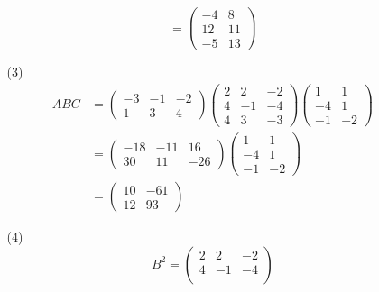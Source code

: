 \documentclass{article}
\begin{document}
\begin{enumerate}
\begin{enumerate}
\[                =
                \begin{pmatrix}
                    -4& 8\\
                    12& 11\\
                    -5& 13
                \end{pmatrix}
            \]
            \item [(3)]
            \begin{align*}
                ABC&=
                \begin{pmatrix}
                    -3& -1& -2\\
                    1& 3& 4 
                \end{pmatrix}
                \begin{pmatrix}
                    2& 2& -2\\
                    4& -1& -4\\
                    4& 3& -3
                \end{pmatrix}
                \begin{pmatrix}
                    1& 1\\
                    -4& 1\\
                    -1& -2
                \end{pmatrix}\\
                &=
                \begin{pmatrix}
                    -18& -11& 16\\
                    30& 11& -26
                \end{pmatrix}
                \begin{pmatrix}
                    1& 1\\
                    -4& 1\\
                    -1& -2
                \end{pmatrix}\\
                &=
                \begin{pmatrix}
                    10& -61\\
                    12& 93
                \end{pmatrix}
            \end{align*}
            \item [(4)]
            \[
                B^2=
                \begin{pmatrix}
                    2& 2& -2\\
                    4& -1& -4\\

\end{pmatrix}\]
\end{enumerate}
\end{enumerate}
\end{document}
